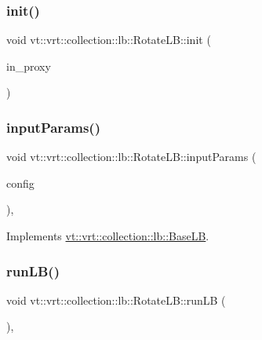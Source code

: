 \subsubsection{\texorpdfstring{init()}{init()}}
{\footnotesize\ttfamily void vt\+::vrt\+::collection\+::lb\+::\+Rotate\+L\+B\+::init (\begin{DoxyParamCaption}\item[{\hyperlink{structvt_1_1objgroup_1_1proxy_1_1_proxy}{objgroup\+::proxy\+::\+Proxy}$<$ \hyperlink{structvt_1_1vrt_1_1collection_1_1lb_1_1_rotate_l_b}{Rotate\+LB} $>$}]{in\+\_\+proxy }\end{DoxyParamCaption})}

\mbox{\label{structvt_1_1vrt_1_1collection_1_1lb_1_1_rotate_l_b_a39b5c8882b32f8a50be30cf2f3fd8fab}} 
\subsubsection{\texorpdfstring{input\+Params()}{inputParams()}}
{\footnotesize\ttfamily void vt\+::vrt\+::collection\+::lb\+::\+Rotate\+L\+B\+::input\+Params (\begin{DoxyParamCaption}\item[{\hyperlink{structvt_1_1vrt_1_1collection_1_1balance_1_1_config_entry}{balance\+::\+Config\+Entry} $\ast$}]{config }\end{DoxyParamCaption})\hspace{0.3cm}{\ttfamily [override]}, {\ttfamily [virtual]}}



Implements \hyperlink{structvt_1_1vrt_1_1collection_1_1lb_1_1_base_l_b_acf56a0cc29f5e00c0dccf2003baa2f43}{vt\+::vrt\+::collection\+::lb\+::\+Base\+LB}.

\mbox{\label{structvt_1_1vrt_1_1collection_1_1lb_1_1_rotate_l_b_a3266fa43e0459b57466d9e184aeae2f7}} 
\subsubsection{\texorpdfstring{run\+L\+B()}{runLB()}}
{\footnotesize\ttfamily void vt\+::vrt\+::collection\+::lb\+::\+Rotate\+L\+B\+::run\+LB (\begin{DoxyParamCaption}\item[{\hyperlink{namespacevt_a8fb51741340b87d7aaee0bef60e9896b}{Load\+Type}}]{ }\end{DoxyParamCaption})\hspace{0.3cm}{\ttfamily [override]}, {\ttfamily [virtual]}}



